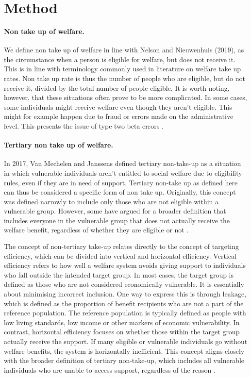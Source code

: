 \section{Method} 

\paragraph{Non take up of welfare.}

We define non take up of welfare in line with Nelson and Nieuwenhuis (2019), as the circumstance when a person is eligible for welfare, but does not receive it. This is in line with terminology commonly used in literature on welfare take up rates. Non take up rate is thus the number of people who are eligible, but do not receive it, divided by the total number of people eligible. It is worth noting, however, that these situations often prove to be more complicated. In some cases, some individuals might receive welfare even though they aren’t eligible. This might for example happen due to fraud or errors made on the administrative level. This presents the issue of type two beta errors \citep{herber_non-take-up_2019, nelson_towards_2021}.

\paragraph{Tertiary non take up of welfare.}
In 2017, Van Mechelen and Janssens defined tertiary non-take-up
as a situation in which vulnerable individuals aren’t entitled to social welfare due to eligibility rules, even
if they are in need of support. Tertiary non-take up as defined here can thus be considered a specific
form of non take up. Originally, this concept was defined narrowly to include only those who are not
eligible within a vulnerable group. However, some have argued for a broader definition that includes
everyone in the vulnerable group that does not actually receive the welfare benefit, regardless of whether
they are eligible or not \citep{mechelen_who_2017, goedeme_concept_2020}.

The concept of non-tertiary take-up relates directly to the concept of targeting efficiency, which can be
divided into vertical and horizontal efficiency. Vertical efficiency refers to how well a welfare system avoids
giving support to individuals who fall outside the intended target group. In most cases, the target group
is defined as those who are not considered economically vulnerable. It is essentially about minimising
incorrect inclusion. One way to express this is through leakage, which is defined as the proportion of
benefit recipients who are not a part of the reference population. The reference population is typically
defined as people with low living standards, low income or other markers of economic vulnerability.
In contrast, horizontal efficiency focuses on whether those within the target group actually receive the
support. If many eligible or vulnerable individuals go without welfare benefits, the system is horizontally
inefficient. This concept aligns closely with the broader definition of tertiary non-take-up, which includes
all vulnerable individuals who are unable to access support, regardless of the reason \citep{mechelen_who_2017, goedeme_concept_2020}.

